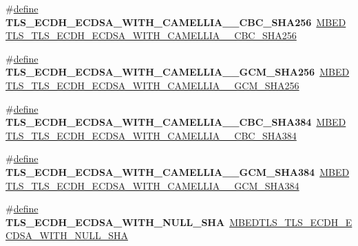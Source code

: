 \begin{DoxyCompactItemize}
\item 
\mbox{\label{compat-1_83_8h_acefce8734244d373ca1009f7404fe273}} 
\#\hyperlink{structdefine}{define} {\bfseries T\+L\+S\+\_\+\+E\+C\+D\+H\+\_\+\+E\+C\+D\+S\+A\+\_\+\+W\+I\+T\+H\+\_\+\+C\+A\+M\+E\+L\+L\+I\+A\+\_\+\_\+\+C\+B\+C\+\_\+\+S\+H\+A256}~\hyperlink{ssl__ciphersuites_8h_a6e5f28a18e10412eacac31a705348069}{M\+B\+E\+D\+T\+L\+S\+\_\+\+T\+L\+S\+\_\+\+E\+C\+D\+H\+\_\+\+E\+C\+D\+S\+A\+\_\+\+W\+I\+T\+H\+\_\+\+C\+A\+M\+E\+L\+L\+I\+A\+\_\+\_\+\+C\+B\+C\+\_\+\+S\+H\+A256}
\item 
\mbox{\label{compat-1_83_8h_a96b67bac844e04c8c12d2ac8f4010c61}} 
\#\hyperlink{structdefine}{define} {\bfseries T\+L\+S\+\_\+\+E\+C\+D\+H\+\_\+\+E\+C\+D\+S\+A\+\_\+\+W\+I\+T\+H\+\_\+\+C\+A\+M\+E\+L\+L\+I\+A\+\_\+\_\+\+G\+C\+M\+\_\+\+S\+H\+A256}~\hyperlink{ssl__ciphersuites_8h_a396ff66618161fdbab1b4b3b46d11ad9}{M\+B\+E\+D\+T\+L\+S\+\_\+\+T\+L\+S\+\_\+\+E\+C\+D\+H\+\_\+\+E\+C\+D\+S\+A\+\_\+\+W\+I\+T\+H\+\_\+\+C\+A\+M\+E\+L\+L\+I\+A\+\_\+\_\+\+G\+C\+M\+\_\+\+S\+H\+A256}
\item 
\mbox{\label{compat-1_83_8h_ad511ab7db03c1ef915d254b102e5a398}} 
\#\hyperlink{structdefine}{define} {\bfseries T\+L\+S\+\_\+\+E\+C\+D\+H\+\_\+\+E\+C\+D\+S\+A\+\_\+\+W\+I\+T\+H\+\_\+\+C\+A\+M\+E\+L\+L\+I\+A\+\_\+\_\+\+C\+B\+C\+\_\+\+S\+H\+A384}~\hyperlink{ssl__ciphersuites_8h_a6ca76006b0a2e6f4a9dfb3a6e0489f7a}{M\+B\+E\+D\+T\+L\+S\+\_\+\+T\+L\+S\+\_\+\+E\+C\+D\+H\+\_\+\+E\+C\+D\+S\+A\+\_\+\+W\+I\+T\+H\+\_\+\+C\+A\+M\+E\+L\+L\+I\+A\+\_\+\_\+\+C\+B\+C\+\_\+\+S\+H\+A384}
\item 
\mbox{\label{compat-1_83_8h_a0d5990fc80d2940513b17c069e640c89}} 
\#\hyperlink{structdefine}{define} {\bfseries T\+L\+S\+\_\+\+E\+C\+D\+H\+\_\+\+E\+C\+D\+S\+A\+\_\+\+W\+I\+T\+H\+\_\+\+C\+A\+M\+E\+L\+L\+I\+A\+\_\+\_\+\+G\+C\+M\+\_\+\+S\+H\+A384}~\hyperlink{ssl__ciphersuites_8h_a107ae7cee72c7cbf9b006d4e3e5eb223}{M\+B\+E\+D\+T\+L\+S\+\_\+\+T\+L\+S\+\_\+\+E\+C\+D\+H\+\_\+\+E\+C\+D\+S\+A\+\_\+\+W\+I\+T\+H\+\_\+\+C\+A\+M\+E\+L\+L\+I\+A\+\_\+\_\+\+G\+C\+M\+\_\+\+S\+H\+A384}
\item 
\mbox{\label{compat-1_83_8h_a9b63e2ae0fc7c63de22c47d1a48c1d4a}} 
\#\hyperlink{structdefine}{define} {\bfseries T\+L\+S\+\_\+\+E\+C\+D\+H\+\_\+\+E\+C\+D\+S\+A\+\_\+\+W\+I\+T\+H\+\_\+\+N\+U\+L\+L\+\_\+\+S\+HA}~\hyperlink{ssl__ciphersuites_8h_a8a4c3646207f54191ad34ae9d02606b6}{M\+B\+E\+D\+T\+L\+S\+\_\+\+T\+L\+S\+\_\+\+E\+C\+D\+H\+\_\+\+E\+C\+D\+S\+A\+\_\+\+W\+I\+T\+H\+\_\+\+N\+U\+L\+L\+\_\+\+S\+HA}

\end{DoxyCompactItemize}
